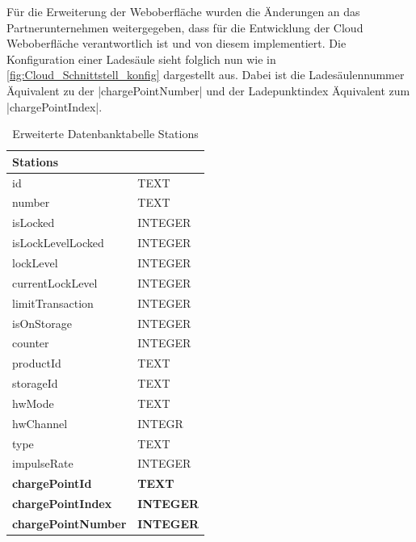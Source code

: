 \noindent Für die Erweiterung der Weboberfläche wurden die Änderungen an das Partnerunternehmen weitergegeben, dass für die Entwicklung der Cloud Weboberfläche verantwortlich ist und von diesem implementiert. Die Konfiguration einer Ladesäule sieht folglich nun wie in \autoref{fig:Cloud_Schnittstell_konfig} dargestellt aus. Dabei ist die Ladesäulennummer Äquivalent zu der \spverb|chargePointNumber| und der Ladepunktindex Äquivalent zum \spverb|chargePointIndex|.
\begin{table}[H]
	\begin{center}
		\begin{tabular}{|ll|}
			\hline
			\multicolumn{2}{|l|}{\textbf{Stations}}           \\ \hline
			\multicolumn{1}{|l|}{id}                & TEXT    \\ \hline
			\multicolumn{1}{|l|}{number}            & TEXT    \\ \hline
			\multicolumn{1}{|l|}{isLocked}          & INTEGER \\ \hline
			\multicolumn{1}{|l|}{isLockLevelLocked} & INTEGER \\ \hline
			\multicolumn{1}{|l|}{lockLevel}         & INTEGER \\ \hline
			\multicolumn{1}{|l|}{currentLockLevel}  & INTEGER \\ \hline
			\multicolumn{1}{|l|}{limitTransaction}  & INTEGER \\ \hline
			\multicolumn{1}{|l|}{isOnStorage}       & INTEGER \\ \hline
			\multicolumn{1}{|l|}{counter}           & INTEGER \\ \hline
			\multicolumn{1}{|l|}{productId}         & TEXT    \\ \hline
			\multicolumn{1}{|l|}{storageId}         & TEXT    \\ \hline
			\multicolumn{1}{|l|}{hwMode}            & TEXT    \\ \hline
			\multicolumn{1}{|l|}{hwChannel}         & INTEGR  \\ \hline
			\multicolumn{1}{|l|}{type}              & TEXT    \\ \hline
			\multicolumn{1}{|l|}{impulseRate}       & INTEGER \\ \hline
			\multicolumn{1}{|l|}{\textbf{chargePointId}}     & \textbf{TEXT}    \\ \hline
			\multicolumn{1}{|l|}{\textbf{chargePointIndex}}  & \textbf{INTEGER} \\ \hline
			\multicolumn{1}{|l|}{\textbf{chargePointNumber}} & \textbf{INTEGER} \\ \hline
		\end{tabular}
	\end{center}
	\caption{Erweiterte Datenbanktabelle \glqq{}Stations\grqq{} \cite{Eigene_Darstellung}}
	\label{tab:Dantenbank_Tabelle_Stations_final}
\end{table}
